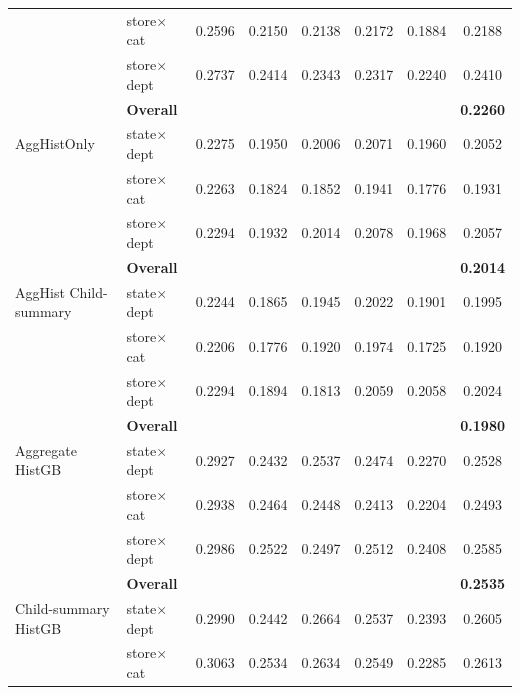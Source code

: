 \documentclass[12pt]{article}
\begin{document}
\begin{table}[H]
\begin{threeparttable}
\begin{tabular}{llccccc|c}
                                   & store$\times$cat       &   0.2596 &   0.2150 &   0.2138 &   0.2172 &   0.1884 &   0.2188 \\
                                   & store$\times$dept      &   0.2737 &   0.2414 &   0.2343 &   0.2317 &   0.2240 &   0.2410 \\
                                   & {\bf Overall} & & & & & & {\bf 0.2260} \\
      \addlinespace
      AggHistOnly                  & state$\times$dept      &   0.2275 &   0.1950 &   0.2006 &   0.2071 &   0.1960 &   0.2052 \\
                                   & store$\times$cat       &   0.2263 &   0.1824 &   0.1852 &   0.1941 &   0.1776 &   0.1931 \\
                                   & store$\times$dept      &   0.2294 &   0.1932 &   0.2014 &   0.2078 &   0.1968 &   0.2057 \\
                                   & {\bf Overall} & & & & & & {\bf 0.2014} \\
      \addlinespace
      AggHist Child-summary        & state$\times$dept      &   0.2244 &   0.1865 &   0.1945 &   0.2022 &   0.1901 &   0.1995 \\
                                   & store$\times$cat       &   0.2206 &   0.1776 &   0.1920 &   0.1974 &   0.1725 &   0.1920 \\
                                   & store$\times$dept      &   0.2294 &   0.1894 &   0.1813 &   0.2059 &   0.2058 &   0.2024 \\
                                   & {\bf Overall} & & & & & & {\bf 0.1980} \\
      \addlinespace
      Aggregate HistGB             & state$\times$dept      &   0.2927 &   0.2432 &   0.2537 &   0.2474 &   0.2270 &   0.2528 \\
                                   & store$\times$cat       &   0.2938 &   0.2464 &   0.2448 &   0.2413 &   0.2204 &   0.2493 \\
                                   & store$\times$dept      &   0.2986 &   0.2522 &   0.2497 &   0.2512 &   0.2408 &   0.2585 \\
                                   & {\bf Overall} & & & & & & {\bf 0.2535} \\
      \addlinespace
      Child-summary HistGB         & state$\times$dept      &   0.2990 &   0.2442 &   0.2664 &   0.2537 &   0.2393 &   0.2605 \\
                                   & store$\times$cat       &   0.3063 &   0.2534 &   0.2634 &   0.2549 &   0.2285 &   0.2613 \\

\end{tabular}
\end{threeparttable}
\end{table}
\end{document}
